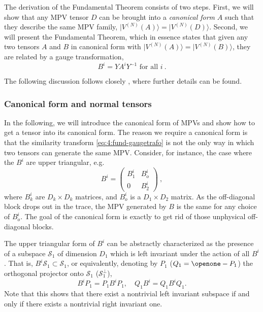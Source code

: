 \documentclass[rmp,aps,reprint,superscriptaddress,nobalancelastpage]{revtex4-1}
\def\Id{{\openone}}
\newcommand{\be}{\begin{equation}}
\newcommand{\ee}{\end{equation}}
\newcommand{\ket}[1]{\vert#1\rangle}
\begin{document}
The derivation of the Fundamental Theorem consists of two steps.
First, we will show that any MPV tensor $D$ can be brought into a \emph{canonical form} $A$ such that they describe the same MPV family, $\ket{V^{(N)}(A)}=\ket{V^{(N)}(D)}$.
Second, we will present the Fundamental Theorem, which in essence states that given any two tensors $A$ and $B$ in canonical form with  $\ket{V^{(N)}(A)}=\ket{V^{(N)}(B)}$, they are related by a gauge transformation,
\begin{equation}
    \label{eq:4:fund-gaugetrafo}
    B^i=YA^iY^{-1}\mbox{\ for all $i$}\ .
\end{equation}

The following discussion follows closely \textcite{cirac:mpdo-rgfp}, where further details can be found.











\subsubsection{Canonical form and normal tensors}

In the following, we will introduce the canonical form of MPVs and show how to get a tensor into its canonical form. The reason we require a canonical form is that the similarity transform \eqref{eq:4:fund-gaugetrafo} is not the only way in which two tensors  can generate the same MPV. Consider, for instance, the case where the $B^i$ are upper triangular, e.g.
\be \label{eq:upper-triangular}
    B^i = \left(\begin{array}{cc} B^i_1 & B^i_o\\ 0 & B^i_2 \end{array}\right)
    \ ,
\ee
where $B^i_k$ are $D_k\times D_k$ matrices, and $B^i_o$ is a $D_1\times D_2$ matrix.
As the off-diagonal block drops out in the trace, the MPV generated by $B$
is the same for any choice of $B^i_o$.
The goal of the canonical form is exactly to get rid of those unphysical off-diagonal blocks.

The upper triangular form of $B^i$ can be abstractly characterized as the presence of a subspace $\mathcal S_1$ of dimension $D_1$ which is left invariant under the action of all $B^i$. That is, $B^i \mathcal S_1\subset \mathcal S_1$, or equivalently, denoting by $P_1$ ($Q_1=\Id-P_1$) the orthogonal projector onto $\mathcal S_1$ ($\mathcal S_1^\perp$),
\be
    B^i P_1 = P_1 B^i P_1,\quad  Q_1 B^i = Q_1 B^i Q_1.
\ee
Note that this shows that there exist a nontrivial left invariant subspace if and only if there exists a nontrivial right invariant one.
\end{document}
